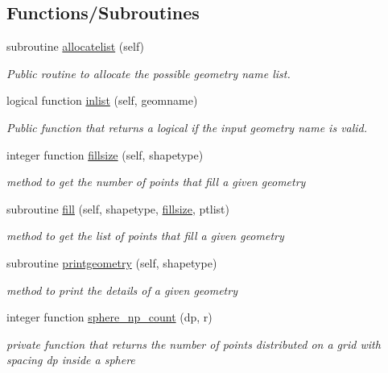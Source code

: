 \subsection*{Functions/\+Subroutines}
\begin{DoxyCompactItemize}
\item 
subroutine \mbox{\hyperlink{namespacegeometry__mod_a1b6f259b0b6be71e02ffae7670f7d8ba}{allocatelist}} (self)
\begin{DoxyCompactList}\small\item\em Public routine to allocate the possible geometry name list. \end{DoxyCompactList}\item 
logical function \mbox{\hyperlink{namespacegeometry__mod_a22dd77024fce56da299445a697256155}{inlist}} (self, geomname)
\begin{DoxyCompactList}\small\item\em Public function that returns a logical if the input geometry name is valid. \end{DoxyCompactList}\item 
integer function \mbox{\hyperlink{namespacegeometry__mod_a92602e1198d3607613ea2722fb002685}{fillsize}} (self, shapetype)
\begin{DoxyCompactList}\small\item\em method to get the number of points that fill a given geometry \end{DoxyCompactList}\item 
subroutine \mbox{\hyperlink{namespacegeometry__mod_a095a8b47b3c23e154dcd31ab1441a065}{fill}} (self, shapetype, \mbox{\hyperlink{namespacegeometry__mod_a92602e1198d3607613ea2722fb002685}{fillsize}}, ptlist)
\begin{DoxyCompactList}\small\item\em method to get the list of points that fill a given geometry \end{DoxyCompactList}\item 
subroutine \mbox{\hyperlink{namespacegeometry__mod_aed4426181ca851b41717edd50268e5f3}{printgeometry}} (self, shapetype)
\begin{DoxyCompactList}\small\item\em method to print the details of a given geometry \end{DoxyCompactList}\item 
integer function \mbox{\hyperlink{namespacegeometry__mod_a05de7940b4e7df5a2b31f3d0414e3743}{sphere\+\_\+np\+\_\+count}} (dp, r)
\begin{DoxyCompactList}\small\item\em private function that returns the number of points distributed on a grid with spacing dp inside a sphere \end{DoxyCompactList}\item 

\end{DoxyCompactItemize}
